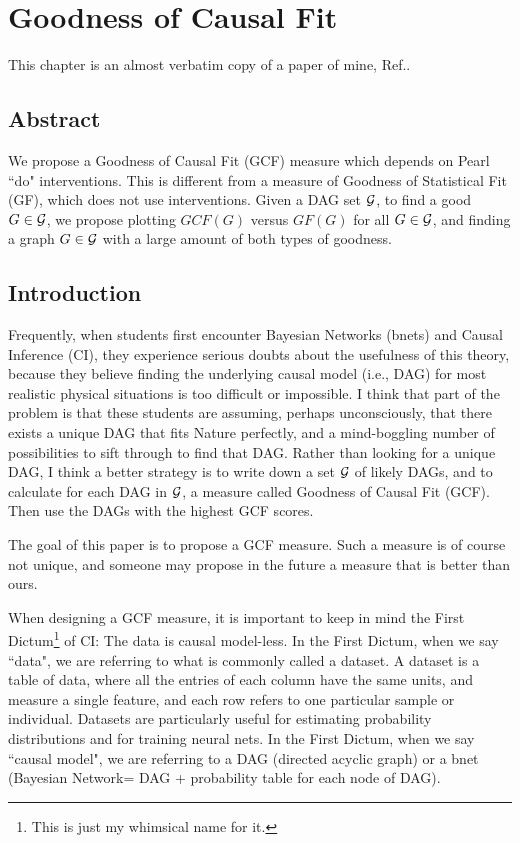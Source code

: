 \chapter{Goodness of Causal Fit}
\label{ch-good-causal-fit}
This chapter
is an almost verbatim 
copy of a paper of mine, Ref.\cite{tucci-gcf}.

\section{Abstract}
We propose a 
Goodness of Causal Fit (GCF) measure
which depends 
on Pearl ``do" interventions.
This is different
from a measure of Goodness of Statistical Fit (GF),
which does not use interventions.
Given a DAG set  ${\cal G}$,
to find a good $G\in {\cal G}$,
we propose plotting
$GCF(G)$ versus $GF(G)$
for all $G\in {\cal G}$,
and finding a 
graph $G\in {\cal G}$  with 
a large amount 
of both types of goodness.

\section{Introduction}



Frequently,
when students
first encounter
Bayesian Networks (bnets)
and Causal Inference (CI),
they experience serious doubts
about the usefulness of this
theory, because they believe
finding the underlying causal model
(i.e., DAG)
for most realistic
 physical situations is
too difficult or impossible.
I think
that part of the problem
is that these students
are assuming, perhaps
unconsciously,
that there exists
a unique DAG
that fits Nature perfectly,
and a mind-boggling number
 of possibilities
to sift through to find that DAG.
Rather than looking
for a unique DAG,
I think a better strategy
is to write down
a set ${\cal G}$ 
of likely DAGs,
and to calculate for 
each DAG in ${\cal G}$,
 a measure called 
Goodness of Causal Fit (GCF).
Then use the DAGs with
the highest GCF scores.


The goal of this paper
is to propose a GCF measure.
Such a measure is of course
not unique,
and someone may propose 
in the future a measure that is better
than ours.

When designing a GCF measure,
it is important to keep
in mind the First Dictum\footnote{
This is just my whimsical name for it.} of CI: The data
 is causal model-less.
 In the First Dictum,
when we say ``data", we are referring to what is commonly
 called a dataset. A dataset is a table of data, where all
 the entries of each column have the same units, and 
measure a single feature, and each row refers to one
 particular sample or individual. Datasets are particularly 
useful for estimating probability distributions and for 
training neural nets. In the First Dictum, when we say
``causal model", we are
referring to a DAG (directed acyclic graph) or a bnet
 (Bayesian Network= DAG + probability table 
for each node of DAG).

